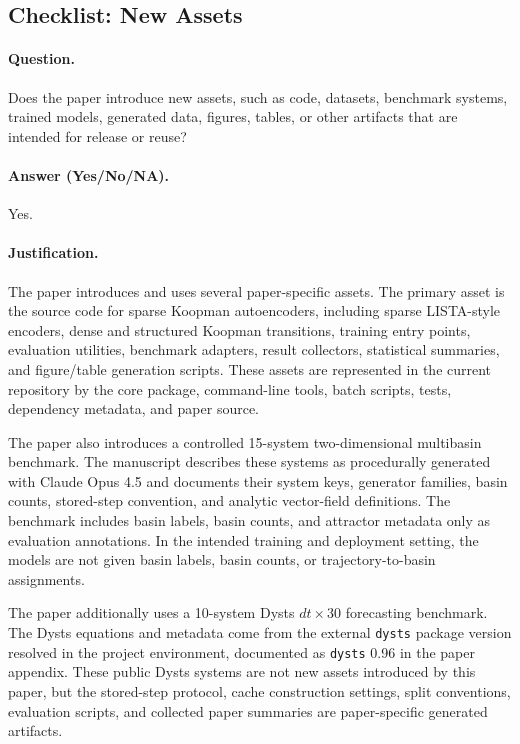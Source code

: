 \subsection{Checklist: New Assets}
\label{app:checklist_new_assets}

\paragraph{Question.}
Does the paper introduce new assets, such as code, datasets, benchmark
systems, trained models, generated data, figures, tables, or other artifacts
that are intended for release or reuse?

\paragraph{Answer (Yes/No/NA).}
Yes.

\paragraph{Justification.}
The paper introduces and uses several paper-specific assets. The primary asset
is the source code for sparse Koopman autoencoders, including sparse LISTA-style
encoders, dense and structured Koopman transitions, training entry points,
evaluation utilities, benchmark adapters, result collectors, statistical
summaries, and figure/table generation scripts. These assets are represented in
the current repository by the core package, command-line tools, batch scripts,
tests, dependency metadata, and paper source.

The paper also introduces a controlled 15-system two-dimensional multibasin
benchmark. The manuscript describes these systems as procedurally generated
with Claude Opus 4.5 and documents their system keys, generator families, basin
counts, stored-step convention, and analytic vector-field definitions. The
benchmark includes basin labels, basin counts, and attractor metadata only as
evaluation annotations. In the intended training and deployment setting, the
models are not given basin labels, basin counts, or trajectory-to-basin
assignments.

The paper additionally uses a 10-system Dysts $dt{\times}30$ forecasting
benchmark. The Dysts equations and metadata come from the external
\texttt{dysts} package version resolved in the project environment, documented
as \texttt{dysts} 0.96 in the paper appendix. These public Dysts systems are not
new assets introduced by this paper, but the stored-step protocol, cache
construction settings, split conventions, evaluation scripts, and collected
paper summaries are paper-specific generated artifacts.

